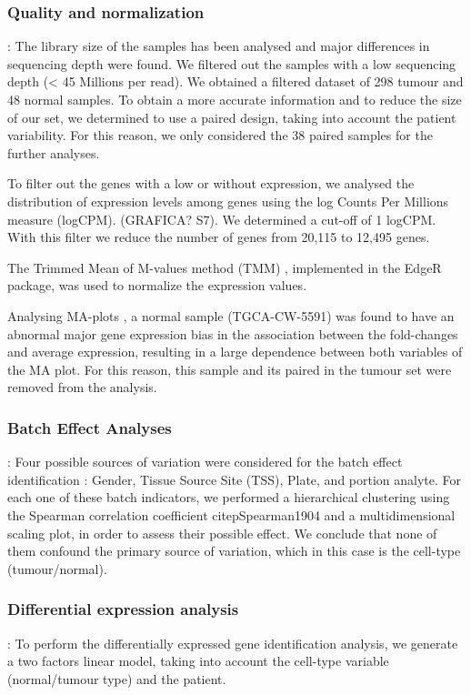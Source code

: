 \documentclass[9pt,twocolumn,twoside]{gsajnl}
\begin{document}
\subsubsection*{Quality and normalization }
: The library size of the samples has been analysed and major differences in sequencing depth were found. We filtered out the samples with a low sequencing depth (< 45 Millions per read). We obtained a filtered dataset of 298 tumour and 48 normal samples. To obtain a more accurate information and to reduce the size of our set, we determined to use a paired design, taking into account the patient variability. For this reason, we only considered the 38 paired samples for the further analyses.

To filter out the genes with a low or without expression, we analysed the distribution of expression levels among genes using the log Counts Per Millions measure (logCPM). (GRAFICA? S7). We determined a cut-off of 1 logCPM. With this filter we reduce the number of genes from 20,115 to 12,495 genes.

The Trimmed Mean of M-values method (TMM) \citep{Robinson2010}, implemented in the EdgeR package, was used to normalize the expression values.

Analysing MA-plots \citep{Dudoit2002}, a normal sample (TGCA-CW-5591) was found to have an abnormal major gene expression bias in the association between the fold-changes and average expression, resulting in a large dependence between both variables of the MA plot. For this reason, this sample and its paired in the tumour set were removed from the analysis.


\subsubsection*{Batch Effect Analyses}
: Four possible sources of variation were considered for the batch effect identification \citep{Leek2010}: Gender, Tissue Source Site (TSS), Plate, and portion analyte. For each one of these batch indicators, we performed a hierarchical clustering using the Spearman correlation coefficient citep{Spearman1904}  and a multidimensional scaling plot, in order to assess their possible effect. We conclude that none of them confound the primary source of variation, which in this case is the cell-type (tumour/normal).

\subsubsection*{Differential expression analysis	}
: To perform the differentially expressed gene identification analysis, we generate a two factors linear model, taking into account the cell-type variable (normal/tumour type) and the patient.
\end{document}
